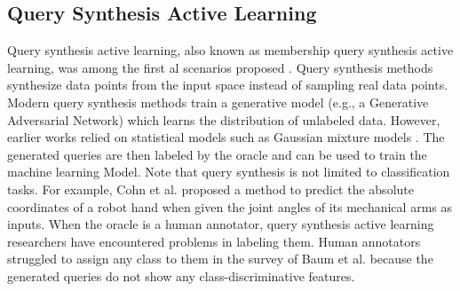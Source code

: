 \subsection{Query Synthesis Active Learning}
\label{sec:QuerySynthesisActiveLearning}
Query synthesis active learning, also known as membership query synthesis active learning, was among the first \gls{al} scenarios proposed
\cite{angluin1988queries}. Query synthesis methods synthesize data points from the input space instead of sampling real data points. Modern query
synthesis methods train a generative model (e.g., a Generative Adversarial Network) \cite{zhu2017generative}
which learns the distribution of unlabeled data. However, earlier works relied on statistical models such as Gaussian mixture models 
\cite{cohn1996active}. The generated queries are then labeled by the oracle and can be used to train the machine learning Model. Note that
query synthesis is not limited to classification tasks. For example, Cohn et al. \cite{cohn1996active} proposed a method to predict the absolute coordinates
of a robot hand when given the joint angles of its mechanical arms as inputs. When the oracle is a human annotator, query synthesis active learning
researchers have encountered problems in labeling them. Human annotators struggled to assign any class to them in the survey of Baum et al. \cite{baum1992query}
because the generated queries do not show any class-discriminative features.



